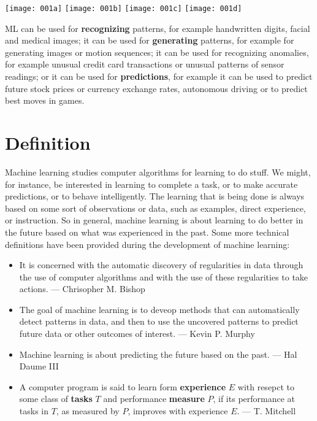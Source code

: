 \begin{figure*}[b!]
  \texttt{[image: 001a]}\hfill
  \texttt{[image: 001b]}\hfill
  \texttt{[image: 001c]}\hfill
  \texttt{[image: 001d]}
\end{figure*}

ML can be used for \textbf{recognizing} patterns, for example handwritten digits, facial and medical images; it can be used for \textbf{generating} patterns, for example for generating images or motion sequences; it can be used for recognizing anomalies, for example unusual credit card transactions or unusual patterns of sensor readings; or it can be used for \textbf{predictions}, for example it can be used to predict future stock prices or currency exchange rates, autonomous driving or to predict best moves in games.

\section{Definition}
Machine learning studies computer algorithms for learning to do stuff. We might, for instance, be interested in learning to complete a task, or to make accurate predictions, or to behave intelligently. The learning that is being done is always based on some sort of observations or data, such as examples, direct experience, or instruction. So in general, machine learning is about learning to do better in the future based on what was experienced in the past. Some more technical definitions have been provided during the development of machine learning:
\begin{itemize}[itemsep=.2em]
    \item It is concerned with the automatic discovery of regularities in data through the use of computer algorithms and with the use of these regularities to take actions. --- Chrisopher M. Bishop
    \item The goal of machine learning is to deveop methods that can automatically detect patterns in data, and then to use the uncovered patterns to predict future data or other outcomes of interest. --- Kevin P. Murphy
    \item Machine learning is about predicting the future based on the past. --- Hal Daume III
    \item A computer program is said to learn form \textbf{experience} \(E\) with resepct to some class of \textbf{tasks} \(T\) and performance \textbf{measure} \(P\), if its performance at tasks in \(T\), as measured by \(P\), improves with experience \(E\). --- T. Mitchell
\end{itemize}

